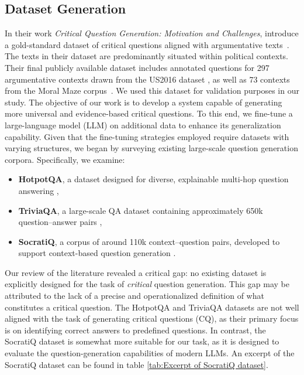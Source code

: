 \documentclass[11pt]{article}
\begin{document}
\subsection{Dataset Generation}
In their work \textit{Critical Question Generation: Motivation and Challenges}, \citet{calvo_figueras_critical_2024} introduce a gold-standard dataset of critical questions aligned with argumentative texts~\citep{calvo_figueras_critical_2024}. The texts in their dataset are predominantly situated within political contexts. Their final publicly available dataset includes annotated questions for 297 argumentative contexts drawn from the US2016 dataset \citep{visser_argumentation_2020}, as well as 73 contexts from the Moral Maze corpus~\citep{lawrence-reed-2015-combining}. We used this dataset for validation purposes in our study. The objective of our work is to develop a system capable of generating more universal and evidence-based critical questions. To this end, we fine-tune a large-language model (LLM) on additional data to enhance its generalization capability. Given that the fine-tuning strategies employed require datasets with varying structures, we began by surveying existing large-scale question generation corpora. Specifically, we examine:
\begin{itemize}
    \item \textbf{HotpotQA}, a dataset designed for diverse, explainable multi-hop question answering \citep{yang_hotpotqa_2018},
    \item \textbf{TriviaQA}, a large-scale QA dataset containing approximately 650k question--answer pairs \citep{joshi_triviaqa_2017},
    \item \textbf{SocratiQ}, a corpus of around 110k context--question pairs, developed to support context-based question generation \citep{ang_socratic_2023}.
\end{itemize}
Our review of the literature revealed a critical gap: no existing dataset is explicitly designed for the task of \textit{critical} question generation. This gap may be attributed to the lack of a precise and operationalized definition of what constitutes a critical question. The HotpotQA and TriviaQA datasets are not well aligned with the task of generating critical questions (CQ), as their primary focus is on identifying correct answers to predefined questions. In contrast, the SocratiQ dataset is somewhat more suitable for our task, as it is designed to evaluate the question-generation capabilities of modern LLMs.  An excerpt of the SocratiQ dataset can be found in table \ref{tab:Excerpt of SocratiQ dataset}. 
\end{document}
